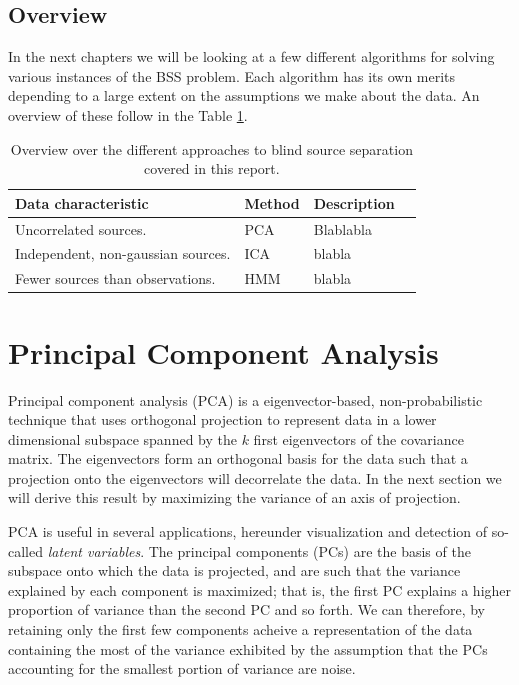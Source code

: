 \documentclass[11pt, oneside, a4paper]{report}
\begin{document}
\section{Overview}

In the next chapters we will be looking at a few different algorithms for solving various instances of the BSS problem. Each algorithm has its own merits depending to a large extent on the assumptions we make about the data. An overview of these follow in the Table \ref{overviewTable}.

\begin{center}
  \begin{table}[h!]
    \begin{tabular}{ | l | l | l | p{5cm} |}
      \hline
      \textbf{Data characteristic} & \textbf{Method} & \textbf{Description} \\ \hline
      Uncorrelated sources. & PCA & Blablabla \\ 
      Independent, non-gaussian sources. & ICA & blabla \\
      Fewer sources than observations. & HMM & blabla \\
      \hline
    \end{tabular}
    \caption{Overview over the different approaches to blind source separation covered in this report.}
    \label{overviewTable}
  \end{table}
\end{center}

\chapter{Principal Component Analysis}

Principal component analysis \cite{pearson1901} (PCA) is a eigenvector-based,
non-probabilistic technique that uses orthogonal projection to
represent data in a lower dimensional subspace spanned by the $k$
first eigenvectors of the covariance matrix. The eigenvectors form an
orthogonal basis for the data such that a projection onto the
eigenvectors will decorrelate the data. In the next section we will
derive this result by maximizing the variance of an axis of projection.

PCA is useful in several applications, hereunder visualization and
detection of so-called \emph{latent variables}. The principal
components (PCs) are the basis of the subspace onto which the data is
projected, and are such that the variance explained by each component
is maximized; that is, the first PC explains a higher proportion of
variance than the second PC and so forth. We can therefore, by
retaining only the first few components acheive a representation of
the data containing the most of the variance exhibited by the
assumption that the PCs accounting for the smallest portion of
variance are noise.
\end{document}
